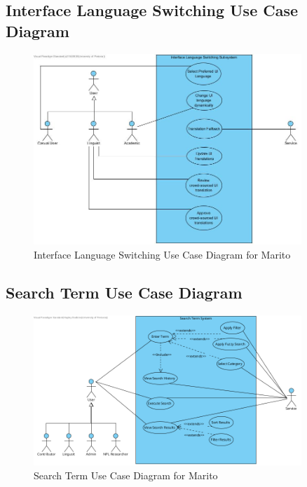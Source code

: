 \documentclass[12pt]{article}
\begin{document}
\subsection{Interface Language Switching Use Case Diagram}
\begin{figure}[H]
  \centering
  \includegraphics[width=0.9\textwidth]{Interface Language Switching Subsystem.jpg}
  \caption{Interface Language Switching Use Case Diagram for Marito}
  \label{fig:interface-lang-switch-use-case}
\end{figure}

\subsection{Search Term Use Case Diagram}
\begin{figure}[H]
  \centering
  \includegraphics[width=0.9\textwidth]{SearchTermUseCase.png}
  \caption{Search Term Use Case Diagram for Marito}
  \label{fig:search-use-case}
\end{figure}
\end{document}
